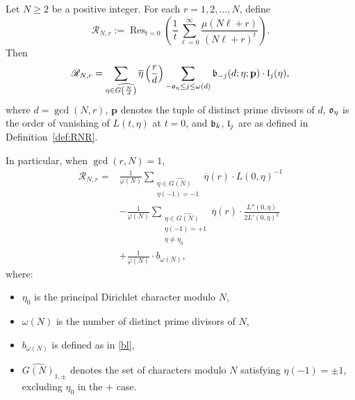 \documentclass[10pt,a4paper]{amsart}
\begin{document}
\begin{proposition}\label{rest}
Let $N \geq 2$ be a positive integer. For each $r = 1, 2, \dots, N$, define
\[
\mathscr{R}_{N,r} := 
\operatorname{Res}_{t=0} \left( \frac{1}{t} \sum_{\ell=0}^\infty \frac{\mu(N\ell + r)}{(N\ell + r)^t} \right).
\]
Then
\[
\mathscr{R}_{N,r} = 
\sum_{\eta \in \widehat{G\left( \frac{N}{d} \right)}} 
\overline{\eta}\left( \frac{r}{d} \right) 
\sum_{-\frak{o}_\eta \leq j \leq \omega(d)} 
\frak{b}_{-j}(d; \eta; \mathbf{p}) \cdot \frak{l}_j(\eta),
\]
where $d = \gcd(N,r)$, $\mathbf{p}$ denotes the tuple of distinct prime divisors of $d$, $\frak{o}_\eta$ is the order of vanishing of $L(t,\eta)$ at $t=0$, and $\frak{b}_k$, $\frak{l}_j$ are as defined in Definition~\ref{def:RNR}.


In particular, when $\gcd(r,N) = 1$,
\begin{equation}\label{casecoprime}
\begin{split}
\mathscr{R}_{N,r} = 
&\frac{1}{\varphi(N)} \sum_{\substack{\eta \in \widehat{G(N)} \\ \eta(-1) = -1}} \overline{\eta}(r) \cdot L(0,\eta)^{-1} \\
&- \frac{1}{\varphi(N)} \sum_{\substack{\eta \in \widehat{G(N)} \\ \eta(-1) = +1 \\ \eta \ne \eta_0}} \overline{\eta}(r) \cdot \frac{L''(0,\eta)}{2 L'(0,\eta)^2} \\
&+ \frac{1}{\varphi(N)} \cdot b_{\omega(N)},
\end{split}
\end{equation}
where:
\begin{itemize}
    \item $\eta_0$ is the principal Dirichlet character modulo $N$,
    \item $\omega(N)$ is the number of distinct prime divisors of $N$,
    \item $b_{\omega(N)}$ is defined as in \eqref{bl},
    \item $\widehat{G(N)}_{1,\pm}$ denotes the set of characters modulo $N$ satisfying $\eta(-1) = \pm 1$, excluding $\eta_0$ in the $+$ case.
\end{itemize}
\end{proposition}
\end{document}
